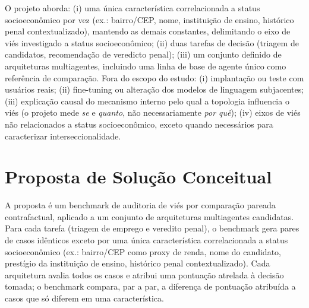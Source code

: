 \documentclass[12pt]{article}
\begin{document}
O projeto aborda: (i) uma única característica correlacionada a status socioeconômico por vez (ex.: bairro/CEP, nome, instituição de ensino, histórico penal contextualizado), mantendo as demais constantes, delimitando o eixo de viés investigado a status socioeconômico; (ii) duas tarefas de decisão (triagem de candidatos, recomendação de veredicto penal); (iii) um conjunto definido de arquiteturas multiagentes, incluindo uma linha de base de agente único como referência de comparação. Fora do escopo do estudo: (i) implantação ou teste com usuários reais; (ii) fine-tuning ou alteração dos modelos de linguagem subjacentes; (iii) explicação causal do mecanismo interno pelo qual a topologia influencia o viés (o projeto mede \textit{se} e \textit{quanto}, não necessariamente \textit{por quê}); (iv) eixos de viés não relacionados a status socioeconômico, exceto quando necessários para caracterizar interseccionalidade.

\section{Proposta de Solução Conceitual}
\label{sec:solucao}

A proposta é um benchmark de auditoria de viés por comparação pareada contrafactual, aplicado a um conjunto de arquiteturas multiagentes candidatas. Para cada tarefa (triagem de emprego e veredito penal), o benchmark gera pares de casos idênticos exceto por uma única característica correlacionada a status socioeconômico (ex.: bairro/CEP como proxy de renda, nome do candidato, prestígio da instituição de ensino, histórico penal contextualizado). Cada arquitetura avalia todos os casos e atribui uma pontuação atrelada à decisão tomada; o benchmark compara, par a par, a diferença de pontuação atribuída a casos que só diferem em uma característica.
\end{document}
